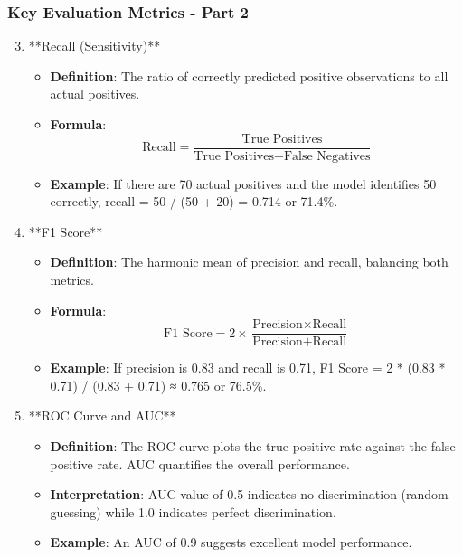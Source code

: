 \documentclass{beamer}
\begin{document}
\begin{frame}[fragile]
    \frametitle{Key Evaluation Metrics - Part 2}
    \begin{enumerate}
        \setcounter{enumi}{2} %
        \item **Recall (Sensitivity)**
        \begin{itemize}
            \item \textbf{Definition}: The ratio of correctly predicted positive observations to all actual positives.
            \item \textbf{Formula}:
            \begin{equation}
                \text{Recall} = \frac{\text{True Positives}}{\text{True Positives} + \text{False Negatives}}
            \end{equation}
            \item \textbf{Example}: If there are 70 actual positives and the model identifies 50 correctly, recall = 50 / (50 + 20) = 0.714 or 71.4\%.
        \end{itemize}

        \item **F1 Score**
        \begin{itemize}
            \item \textbf{Definition}: The harmonic mean of precision and recall, balancing both metrics.
            \item \textbf{Formula}:
            \begin{equation}
                \text{F1 Score} = 2 \times \frac{\text{Precision} \times \text{Recall}}{\text{Precision} + \text{Recall}}
            \end{equation}
            \item \textbf{Example}: If precision is 0.83 and recall is 0.71, F1 Score = 2 * (0.83 * 0.71) / (0.83 + 0.71) ≈ 0.765 or 76.5\%.
        \end{itemize}

        \item **ROC Curve and AUC**
        \begin{itemize}
            \item \textbf{Definition}: The ROC curve plots the true positive rate against the false positive rate. AUC quantifies the overall performance.
            \item \textbf{Interpretation}: AUC value of 0.5 indicates no discrimination (random guessing) while 1.0 indicates perfect discrimination.
            \item \textbf{Example}: An AUC of 0.9 suggests excellent model performance.
        \end{itemize}
    \end{enumerate}
\end{frame}
\end{document}
